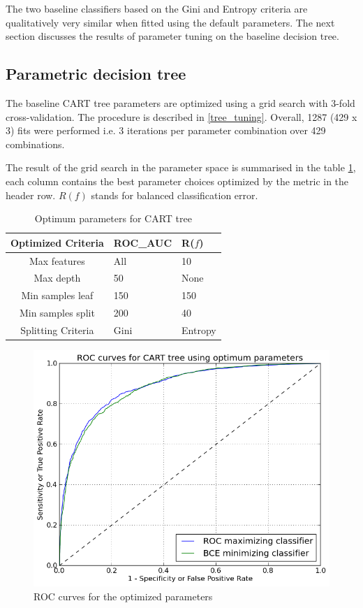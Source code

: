 \documentclass[final,3p,times,twocolumn]{elsarticle}
\begin{document}
The two baseline classifiers based on the Gini and Entropy criteria are qualitatively very similar when fitted using the default parameters. The next section discusses the results of parameter tuning on the baseline decision tree. 

\subsection{Parametric decision tree}
\label{param}

The baseline CART tree parameters are optimized using a grid search with 3-fold cross-validation. The procedure is described in \ref{tree_tuning}. Overall, 1287 (429 x 3) fits were performed i.e. 3 iterations per parameter combination over 429 combinations. 

The result of the grid search in the parameter space is summarised in the table \ref{param_tree}, each column contains the best parameter choices optimized by the metric in the header row. $R(f)$ stands for balanced classification error.  

\begin{table}[ht]
\begin{tabular}{c|l|l}
Optimized Criteria & ROC\_AUC & R($f$) \\
\toprule
Max features & All & 10\\
\midrule
Max depth & 50 & None\\
\midrule
Min samples leaf & 150 & 150 \\
\midrule
Min samples split & 200 & 40\\
\midrule
Splitting Criteria & Gini & Entropy\\ 
\end{tabular}
\caption{Optimum parameters for CART tree}
\label{param_tree}
\end{table}

\begin{figure}
\hspace{-0.5cm}
\includegraphics[scale=0.5]{Images/ROC_Optimum.png}
\caption{ROC curves for the optimized parameters}
\label{ROC_optimum}
\end{figure}
\end{document}
